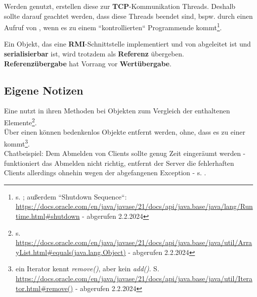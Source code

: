 \noindent
Werden  genutzt, erstellen diese zur \textbf{TCP}-Kommunikation Threads.
Deshalb sollte darauf geachtet werden, dass diese Threads beendet sind, bspw. durch einen Aufruf von , wenn es zu einem ``kontrollierten`` Programmende kommt\footnote{s. \cite[352]{Oec22}; außerdem ``Shutdown Sequence``: \url{https://docs.oracle.com/en/java/javase/21/docs/api/java.base/java/lang/Runtime.html#shutdown} - abgerufen 2.2.2024
}.\\

\begin{tcolorbox}
    \item Ein Objekt, das eine \textbf{RMI}-Schnittstelle implementiert und von  abgeleitet ist und \textbf{serialisierbar} ist, wird trotzdem als \textbf{Referenz} übergeben.\\

    \noindent
    \textbf{Referenzübergabe} hat Vorrang vor \textbf{Wertübergabe}.
\end{tcolorbox}

\subsection*{Eigene Notizen}

\noindent
Eine  nutzt in ihren Methoden bei Objekten  zum Vergleich der enthaltenen Elemente\footnote{
    s. \url{https://docs.oracle.com/en/java/javase/21/docs/api/java.base/java/util/ArrayList.html#equals(java.lang.Object)} - abgerufen 2.2.2024
}.\\

\noindent
Über einen  können bedenkenlos Objekte entfernt werden, ohne, dass es zu einer  kommt\footnote{ein Iterator kennt \textit{remove()}, aber kein \textit{add()}. S. \url{https://docs.oracle.com/en/java/javase/21/docs/api/java.base/java/util/Iterator.html#remove()} - abgerufen 2.2.2024}.\\


\noindent
Chatbeispiel: Dem Abmelden von Clients sollte genug Zeit eingeräumt werden - funktioniert das Abmelden nicht richtig, entfernt der Server die fehlerhaften Clients allerdings ohnehin wegen der abgefangenen Exception - s. \cite[345, Listing 6.22]{Oec22}.